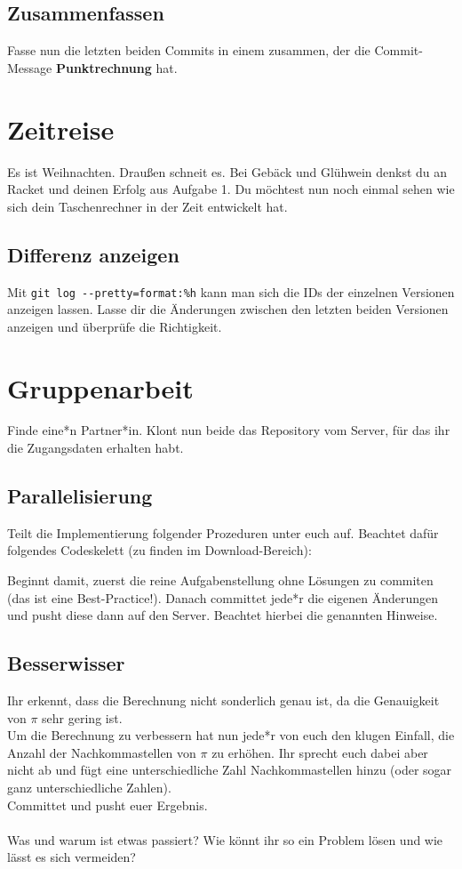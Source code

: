 \documentclass[accentcolor=tud8b,colorbacktitle,12pt]{tudexercise}
\begin{document}
\subsection{Zusammenfassen}
Fasse nun die letzten beiden Commits in einem zusammen, der die Commit-Message \textbf{Punktrechnung} hat.

\section{Zeitreise}
Es ist Weihnachten. Draußen schneit es. Bei Gebäck und Glühwein denkst du an Racket und deinen Erfolg aus Aufgabe 1. Du möchtest nun noch einmal sehen wie sich dein Taschenrechner in der Zeit entwickelt hat.
\subsection{Differenz anzeigen}
Mit \texttt{git log -{-}pretty=format:\%h} kann man sich die IDs der einzelnen Versionen anzeigen lassen. Lasse dir die Änderungen zwischen den letzten beiden Versionen anzeigen und überprüfe die Richtigkeit.

\section{Gruppenarbeit}
Finde eine*n Partner*in.
Klont nun beide das Repository vom Server, für das ihr die Zugangsdaten erhalten habt.
\subsection{Parallelisierung}
Teilt die Implementierung folgender Prozeduren unter euch auf. Beachtet dafür folgendes Codeskelett (zu finden im Download-Bereich):

Beginnt damit, zuerst die reine Aufgabenstellung ohne Lösungen zu commiten (das ist eine Best-Practice!).
Danach committet jede*r die eigenen Änderungen und pusht diese dann auf den Server.
Beachtet hierbei die genannten Hinweise.

\subsection{Besserwisser}
Ihr erkennt, dass die Berechnung nicht sonderlich genau ist, da die Genauigkeit von $\pi$ sehr gering ist.\\
Um die Berechnung zu verbessern hat nun jede*r von euch den klugen Einfall, die Anzahl der Nachkommastellen von $\pi$ zu erhöhen. Ihr sprecht euch dabei aber nicht ab und fügt eine unterschiedliche Zahl Nachkommastellen hinzu (oder sogar ganz unterschiedliche Zahlen).\\
Committet und pusht euer Ergebnis.\\\\
Was und warum ist etwas passiert? Wie könnt ihr so ein Problem lösen und wie lässt es sich vermeiden?
\end{document}
